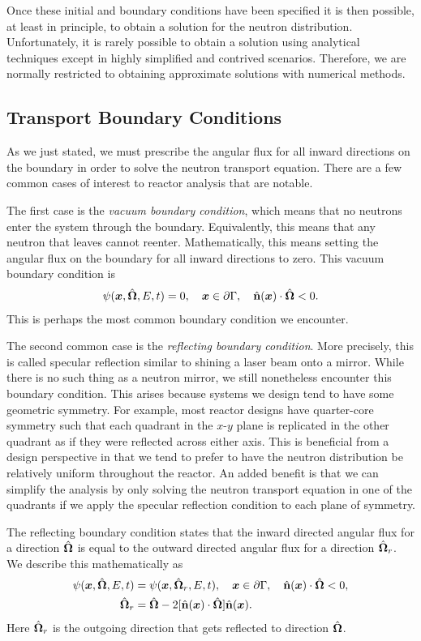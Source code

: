 Once these initial and boundary conditions have been specified it is then possible, at least in principle, to obtain a solution for the neutron distribution. Unfortunately, it is rarely possible to obtain a solution using analytical techniques except in highly simplified and contrived scenarios. Therefore, we are normally restricted to obtaining approximate solutions with numerical methods.

\subsection{Transport Boundary Conditions}

As we just stated, we must prescribe the angular flux for all inward directions on the boundary in order to solve the neutron transport equation. There are a few common cases of interest to reactor analysis that are notable.

The first case is the \emph{vacuum boundary condition}, which means that no neutrons enter the system through the boundary. Equivalently, this means that any neutron that leaves cannot reenter. Mathematically, this means setting the angular flux on the boundary for all inward directions to zero. This vacuum boundary condition is
\begin{align}
  \psi(\bm{x},\hat{\mathbf{\Omega}},E,t) = 0, \quad \bm{x} \in \partial \Gamma , \quad \hat{\mathbf{n}}(\bm{x}) \cdot \hat{\mathbf{\Omega}} < 0.
\end{align}
This is perhaps the most common boundary condition we encounter.

The second common case is the \emph{reflecting boundary condition}. More precisely, this is called specular reflection similar to shining a laser beam onto a mirror. While there is no such thing as a neutron mirror, we still nonetheless encounter this boundary condition. This arises because systems we design tend to have some geometric symmetry. For example, most reactor designs have quarter-core symmetry such that each quadrant in the $x$-$y$ plane is replicated in the other quadrant as if they were reflected across either axis. This is beneficial from a design perspective in that we tend to prefer to have the neutron distribution be relatively uniform throughout the reactor. An added benefit is that we can simplify the analysis by only solving the neutron transport equation in one of the quadrants if we apply the specular reflection condition to each plane of symmetry.

The reflecting boundary condition states that the inward directed angular flux for a direction $\hat{\mathbf{\Omega}}$ is equal to the outward directed angular flux for a direction $\hat{\mathbf{\Omega}}_r$. We describe this mathematically as
\begin{subequations}
\begin{align}
  \psi(\bm{x},\hat{\mathbf{\Omega}},E,t) &= \psi(\bm{x},\hat{\mathbf{\Omega}}_r,E,t) ,  \quad \bm{x} \in \partial \Gamma , \quad \hat{\mathbf{n}}(\bm{x}) \cdot \hat{\mathbf{\Omega}} < 0, \\
  \hat{\mathbf{\Omega}}_r &= \hat{\mathbf{\Omega}} - 2 [ \hat{\mathbf{n}}(\bm{x}) \cdot \hat{\mathbf{\Omega}} ] \hat{\mathbf{n}}(\bm{x}) .
\end{align}
\end{subequations}
Here $\hat{\mathbf{\Omega}}_r$ is the outgoing direction that gets reflected to direction $\hat{\mathbf{\Omega}}$.

